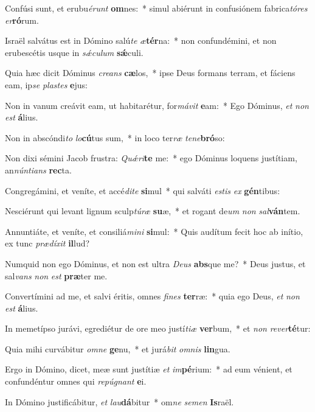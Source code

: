 \item Confúsi sunt, et erubu\textit{é}\textit{runt} \textbf{om}nes:~* simul abiérunt in confusiónem fabrica\textit{tó}\textit{res} \textit{er}\textbf{ró}rum.
\item Israël salvátus est in Dómino salú\textit{te} \textit{æ}\textbf{tér}na:~* non confundémini, et non erubescétis usque in \textit{sǽ}\textit{cu}\textit{lum} \textbf{sǽ}culi.
\item Quia hæc dicit Dóminus \textit{cre}\textit{ans} \textbf{cæ}los,~* ipse Deus formans terram, et fáciens eam, ip\textit{se} \textit{plas}\textit{tes} \textbf{e}jus:
\item Non in vanum creávit eam, ut habitarétur, for\textit{má}\textit{vit} \textbf{e}am:~* Ego Dóminus, \textit{et} \textit{non} \textit{est} \textbf{á}lius.
\item Non in abscóndi\textit{to} \textit{lo}\textbf{cú}tus sum,~* in loco ter\textit{ræ} \textit{te}\textit{ne}\textbf{bró}so:
\item Non dixi sémini Jacob frustra: \textit{Quǽ}\textit{ri}\textbf{te} me:~* ego Dóminus loquens justítiam, an\textit{nún}\textit{ti}\textit{ans} \textbf{rec}ta.
\item Congregámini, et veníte, et accé\textit{di}\textit{te} \textbf{si}mul~* qui salváti \textit{es}\textit{tis} \textit{ex} \textbf{gén}tibus:
\item Nesciérunt qui levant lignum sculp\textit{tú}\textit{ræ} \textbf{su}æ,~* et rogant de\textit{um} \textit{non} \textit{sal}\textbf{ván}tem.
\item Annuntiáte, et veníte, et consiliá\textit{mi}\textit{ni} \textbf{si}mul:~* Quis audítum fecit hoc ab inítio, ex tunc \textit{præ}\textit{dí}\textit{xit} \textbf{il}lud?
\item Numquid non ego Dóminus, et non est ultra \textit{De}\textit{us} \textbf{abs}que me?~* Deus justus, et sal\textit{vans} \textit{non} \textit{est} \textbf{præ}ter me.
\item Convertímini ad me, et salvi éritis, omnes \textit{fi}\textit{nes} \textbf{ter}ræ:~* quia ego Deus, \textit{et} \textit{non} \textit{est} \textbf{á}lius.
\item In memetípso jurávi, egrediétur de ore meo justí\textit{ti}\textit{æ} \textbf{ver}bum,~* et \textit{non} \textit{re}\textit{ver}\textbf{té}tur:
\item Quia mihi curvábitur \textit{om}\textit{ne} \textbf{ge}nu,~* et jurá\textit{bit} \textit{om}\textit{nis} \textbf{lin}gua.
\item Ergo in Dómino, dicet, meæ sunt justítiæ \textit{et} \textit{im}\textbf{pé}rium:~* ad eum vénient, et confundéntur omnes qui \textit{re}\textit{pú}\textit{gnant} \textbf{e}i.
\item In Dómino justificábitur, \textit{et} \textit{lau}\textbf{dá}bitur~* om\textit{ne} \textit{se}\textit{men} \textbf{Is}raël.
